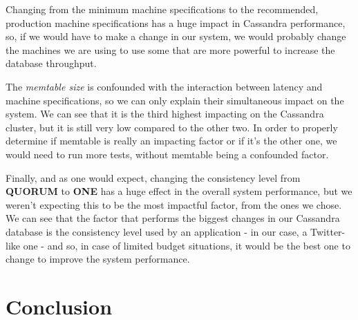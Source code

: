 \documentclass[runningheads]{llncs}
\begin{document}
Changing from the minimum machine specifications to the recommended, production machine specifications has a huge impact in Cassandra performance, so, if we would have to make a change in our system, we would probably change the machines we are using to use some that are more powerful to increase the database throughput.

The \emph{memtable size} is confounded with the interaction between latency and machine specifications, so we can only explain their simultaneous impact on the system. We can see that it is the third highest impacting on the Cassandra cluster, but it is still very low compared to the other two. In order to properly determine if memtable is really an impacting factor or if it's the other one, we would need to run more tests, without memtable being a confounded factor.

Finally, and as one would expect, changing the consistency level from \textbf{QUORUM} to \textbf{ONE} has a huge effect in the overall system performance, but we weren't expecting this to be the most impactful factor, from the ones we chose. We can see that the factor that performs the biggest changes in our Cassandra database is the consistency level used by an application - in our case, a Twitter-like one - and so, in case of limited budget situations, it would be the best one to change to improve the system performance.

\section{Conclusion}

\end{document}
